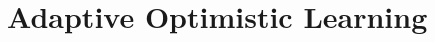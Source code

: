 \documentclass[paper_icml.tex]{subfiles}
\begin{document}
\section{Adaptive Optimistic Learning} 
\label{sec:machinery}
\end{document}
